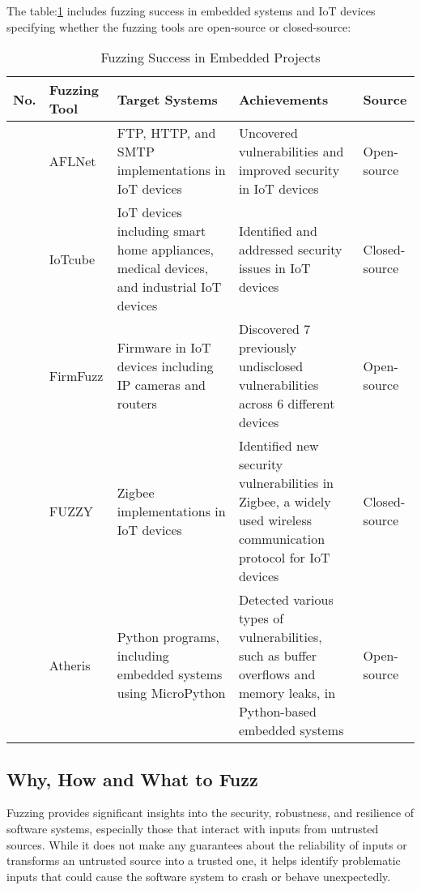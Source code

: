 

The table:\ref{tab:embedded_fuzzing_success} includes fuzzing success in embedded systems and IoT devices
specifying whether the fuzzing tools are open-source or closed-source:

\begin{table}[h!]
\centering
\begin{tabularx}{\textwidth}{@{}>{\raggedright\arraybackslash}p{0.5cm}>{\raggedright\arraybackslash}p{1.5cm}>{\raggedright\arraybackslash}p{3.8cm}X>{\raggedright\arraybackslash}p{1.2cm}@{}}
\toprule
\textbf{No.} & \textbf{Fuzzing Tool} & \textbf{Target Systems} & \textbf{Achievements} & \textbf{Source} \\
\midrule
1 & AFLNet & FTP, HTTP, and SMTP implementations in IoT devices & Uncovered vulnerabilities and improved security in IoT devices\cite{lin2020aflnet} & Open-source \\
\addlinespace
2 & IoTcube & IoT devices including smart home appliances, medical devices, and industrial IoT devices & Identified and addressed security issues in IoT devices\cite{kim2019iotcube} & Closed-source \\
\addlinespace
3 & FirmFuzz & Firmware in IoT devices including IP cameras and routers & Discovered 7 previously undisclosed vulnerabilities across 6 different devices\cite{srivastava2019firmfuzz} & Open-source \\
\addlinespace
4 & FUZZY & Zigbee implementations in IoT devices & Identified new security vulnerabilities in Zigbee, a widely used wireless communication protocol for IoT devices\cite{vidas2019fuzzy} & Closed-source \\
\addlinespace
5 & Atheris & Python programs, including embedded systems using MicroPython & Detected various types of vulnerabilities, such as buffer overflows and memory leaks, in Python-based embedded systems\cite{atheris2020} & Open-source \\
\bottomrule
\end{tabularx}
\caption{Fuzzing Success in Embedded Projects}
\label{tab:embedded_fuzzing_success}
\end{table}


\subsection{Why, How and What to Fuzz}

Fuzzing provides significant insights into the security, robustness,
and resilience of software systems, especially those that interact with inputs
from untrusted sources. While it does not make any guarantees about the
reliability of inputs or transforms an untrusted source into a trusted one,
it helps identify problematic inputs that could cause the software system to
crash or behave
unexpectedly\cite{bohme2020fuzzing}\cite{beaman2022fuzzing}\cite{vidas2019fuzzy}\cite{WhatisFu63:online}.


